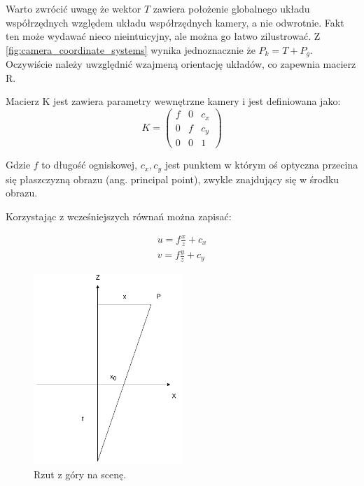 \documentclass[oneside, eng]{mgr}
\begin{document}
Warto zwrócić uwagę że wektor $T$ zawiera położenie globalnego układu współrzędnych względem układu współrzędnych kamery, a nie odwrotnie. Fakt ten może wydawać nieco nieintuicyjny, ale można go łatwo zilustrować. Z \ref{fig:camera_coordinate_systems} wynika jednoznacznie że $P_k = T + P_g$. Oczywiście należy uwzględnić wzajmeną orientację układów, co zapewnia macierz R.

Macierz K jest zawiera parametry wewnętrzne kamery i jest definiowana jako:
\begin{equation}
	K = \left( \begin{array}{lll}
		f & 0 & c_x \\
		0 & f & c_y \\
		0 & 0 & 1
	\end{array} \right)
\end{equation}

Gdzie $f$ to długość ogniskowej, $c_x, c_y$ jest punktem w którym oś optyczna przecina się płaszczyzną obrazu (ang. principal point), zwykle znajdujący się w środku obrazu.

Korzystając z wcześniejszych równań można zapisać:

\begin{align*}
	u = f \frac{x}{z} + c_x \\
	v = f \frac{y}{z} + c_y
\end{align*}

\begin{figure}
\centering
	\includegraphics[width=0.50\textwidth]{rzutowanie.jpg}\par\vspace{1cm}
\caption{Rzut z góry na scenę.}
	\label{fig:projection_up}
\end{figure}
\end{document}
